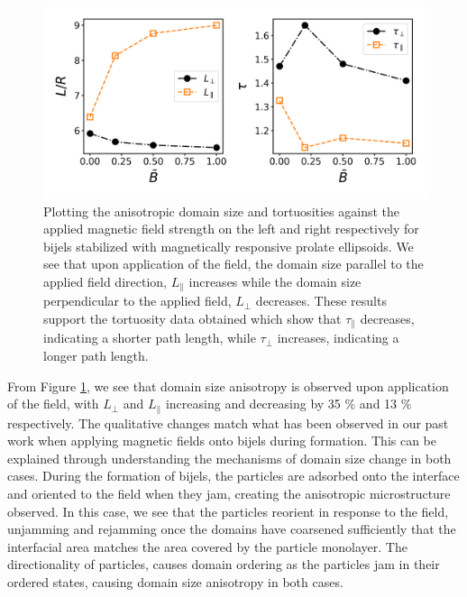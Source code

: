 \begin{figure} 
    \centering 
    \includegraphics{../figures/results/paper2/domain_size_aniso-field_on.png} 
    \caption{Plotting the anisotropic domain size and tortuosities against the applied magnetic field strength on 
             the left and right respectively for bijels stabilized with magnetically responsive prolate ellipsoids. 
             We see that upon application of the field, the domain size parallel to the applied field direction, 
             $L_{\parallel}$ increases while the domain size perpendicular to the applied field, $L_{\perp}$ decreases.
             These results support the tortuosity data obtained which show that $\tau_{\parallel}$ decreases, 
             indicating a shorter path length, while $\tau_{\perp}$ increases, indicating a longer path length.} 
    \label{fig:domain_size_aniso-field_on} 
\end{figure}

From Figure \ref{fig:domain_size_aniso-field_on}, we see that domain size anisotropy is observed upon application of the field, with $L_{\perp}$ and $L_{\parallel}$ increasing and decreasing by 35 $\%$ and 13 $\%$ respectively. The qualitative changes match what has been observed in our past work when applying magnetic fields onto bijels during formation. \cite{karthikeyan_formation_2024} This can be explained through understanding the mechanisms of domain size change in both cases. During the formation of bijels, the particles are adsorbed onto the interface and oriented to the field when they jam, creating the anisotropic microstructure observed. In this case, we see that the particles reorient in response to the field, unjamming and rejamming once the domains have coarsened sufficiently that the interfacial area matches the area covered by the particle monolayer. The directionality of particles, causes domain ordering as the particles jam in their ordered states, causing domain size anisotropy in both cases.

